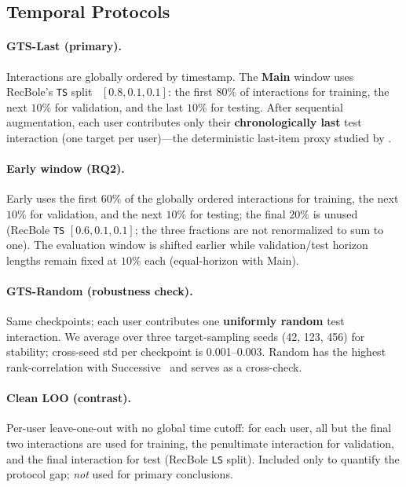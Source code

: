 \documentclass[sigconf,natbib=true,anonymous]{acmart}
\begin{document}
\subsection{Temporal Protocols}
\label{sec:protocol}

\paragraph{GTS-Last (primary).}
Interactions are globally ordered by timestamp.
The \textbf{Main} window uses RecBole's \texttt{TS} split~\cite{zhao2021recbole} $[0.8,0.1,0.1]$: the first $80\%$ of interactions for training, the next $10\%$ for validation, and the last $10\%$ for testing.
After sequential augmentation, each user contributes only their \textbf{chronologically last} test interaction (one target per user)---the deterministic last-item proxy studied by \citet{gusak2025time}.

\paragraph{Early window (RQ2).}
Early uses the first $60\%$ of the globally ordered interactions for training, the next $10\%$ for validation, and the next $10\%$ for testing; the final $20\%$ is unused (RecBole \texttt{TS} $[0.6,0.1,0.1]$; the three fractions are not renormalized to sum to one).
The evaluation window is shifted earlier while validation/test horizon lengths remain fixed at $10\%$ each (equal-horizon with Main).

\paragraph{GTS-Random (robustness check).}
Same checkpoints; each user contributes one \textbf{uniformly random} test interaction.  We average over three target-sampling seeds (42, 123, 456) for stability; cross-seed std per checkpoint is 0.001--0.003.
Random has the highest rank-correlation with Successive~\cite{gusak2025time} and serves as a cross-check.

\paragraph{Clean LOO (contrast).}
Per-user leave-one-out with no global time cutoff: for each user, all but the final two interactions are used for training, the penultimate interaction for validation, and the final interaction for test (RecBole \texttt{LS} split).
Included only to quantify the protocol gap; \emph{not} used for primary conclusions.
\end{document}
